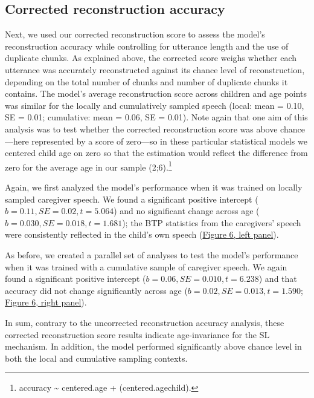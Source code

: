 \documentclass[
  english,
  man,floatsintext]{apa6}
\begin{document}
\hypertarget{corrected-reconstruction-accuracy-1}{%
\subsection{Corrected reconstruction accuracy}\label{corrected-reconstruction-accuracy-1}}

Next, we used our corrected reconstruction score to assess the model's reconstruction accuracy while controlling for utterance length and the use of duplicate chunks. As explained above, the corrected score weighs whether each utterance was accurately reconstructed against its chance level of reconstruction, depending on the total number of chunks and number of duplicate chunks it contains. The model's average reconstruction score across children and age points was similar for the locally and cumulatively sampled speech (local: mean = 0.10, SE = 0.01; cumulative: mean = 0.06, SE = 0.01). Note again that one aim of this analysis was to test whether the corrected reconstruction score was above chance---here represented by a score of zero---so in these particular statistical models we centered child age on zero so that the estimation would reflect the difference from zero for the average age in our sample (2;6).\footnote{accuracy \textasciitilde{} centered.age + (centered.age\textbar child).}

Again, we first analyzed the model's performance when it was trained on locally sampled caregiver speech. We found a significant positive intercept (\(b = 0.11, SE = 0.02, t = 5.064\)) and no significant change across age (\(b = 0.030, SE = 0.018, t = 1.681\)); the BTP statistics from the caregivers' speech were consistently reflected in the child's own speech (\protect\hyperlink{fig6}{Figure 6, left panel}).

As before, we created a parallel set of analyses to test the model's performance when it was trained with a cumulative sample of caregiver speech. We again found a significant positive intercept (\(b= 0.06, SE = 0.010, t = 6.238\)) and that accuracy did not change significantly across age (\(b=0.02, SE = 0.013, t = 1.590\); \protect\hyperlink{fig6}{Figure 6, right panel}).

In sum, contrary to the uncorrected reconstruction accuracy analysis, these corrected reconstruction score results indicate age-invariance for the SL mechanism. In addition, the model performed significantly above chance level in both the local and cumulative sampling contexts.
\end{document}
